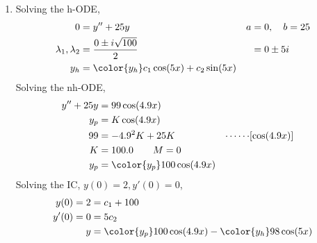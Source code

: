 \begin{enumerate}
    \item Solving the h-ODE,
          \begin{align}
              0                        & = y'' + 25y                                 & a & = 0, \quad b = 25 \\
              \lambda_{1}, \lambda_{2} & = \frac{0 \pm i\sqrt{100}}{2}               &   & = 0 \pm 5i        \\
              y_{h}                    & = \color{y_h} c_{1}\cos(5x) + c_{2}\sin(5x)
          \end{align}
          Solving the nh-ODE,
          \begin{align}
              y'' + 25y & = 99\cos(4.9 x)                                             \\
              y_{p}     & = K\cos(4.9 x)                                              \\
              99        & = -4.9^{2}K + 25K            & \cdots\cdots & [\cos(4.9 x)] \\
              K         & = 100.0 \qquad M = 0                                        \\
              y_{p}     & = \color{y_p} 100\cos(4.9 x)
          \end{align}
          Solving the IC, $ y(0) = 2, y'(0) = 0 $,
          \begin{align}
              y(0) = 2  & = c_{1} + 100                  \\
              y'(0) = 0 & = 5c_{2}                       \\
              y         & = {\color{y_p} 100\cos(4.9x) }
              - {\color{y_h} 98\cos(5x)}
          \end{align}

          \begin{figure}[H]
              \centering
          \end{figure}


\end{enumerate}
